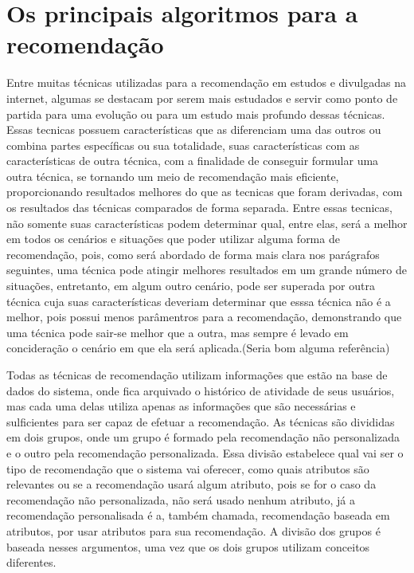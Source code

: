 \documentclass[12pt,
				openright,
				twoside,
				a4paper,
				apter=TITLE,
				section=TITLE,
				subsection=TITLE,
				chapter=TITLE,
				english,
				french,
				spanish,
				brazil]{abntex2}
\begin{document}
\section{Os principais algoritmos para a recomendação}
Entre muitas técnicas utilizadas para a recomendação em estudos e divulgadas na internet, algumas se destacam por serem mais estudados e servir como ponto de partida para uma evolução ou para um estudo mais profundo dessas técnicas. Essas tecnicas possuem características que as diferenciam uma das outros ou combina partes específicas ou sua totalidade, suas características com as características de outra técnica, com a finalidade de conseguir formular uma outra técnica, se tornando um meio de recomendação mais eficiente, proporcionando resultados melhores do que as tecnicas que foram derivadas, com os resultados das técnicas comparados de forma separada. Entre essas tecnicas, não somente suas características podem determinar qual, entre elas, será a melhor em todos os cenários e situações que poder utilizar alguma forma de recomendação, pois, como será abordado de forma mais clara nos parágrafos seguintes, uma técnica pode atingir melhores resultados em um grande número de situações, entretanto, em algum outro cenário, pode ser superada por outra técnica cuja suas características deveriam determinar que esssa técnica não é a melhor, pois possui menos parâmentros para a recomendação, demonstrando que uma técnica pode sair-se melhor que a outra, mas sempre é levado em concideração o cenário em que ela será aplicada.(Seria bom alguma referência)

Todas as técnicas de recomendação utilizam informações que estão na base de dados do sistema, onde fica arquivado o histórico de atividade de seus usuários, mas cada uma delas utiliza apenas as informações que são necessárias  e sulficientes para ser capaz de efetuar a recomendação. As técnicas são divididas em dois grupos, onde um grupo é formado pela recomendação não personalizada e o outro pela recomendação personalizada\cite{schafer1999recommender}\cite{kantor2011recommender}. Essa divisão estabelece qual vai ser o tipo de recomendação que o sistema vai oferecer, como quais atributos são relevantes ou se a recomendação usará algum atributo, pois se for o caso da recomendação não personalizada, não será usado nenhum atributo, já a recomendação personalisada é a, também chamada, recomendação baseada em atributos\cite{schafer1999recommender}, por usar atributos para sua recomendação. A divisão dos grupos é baseada nesses argumentos, uma vez que os dois grupos utilizam conceitos diferentes.
\end{document}
